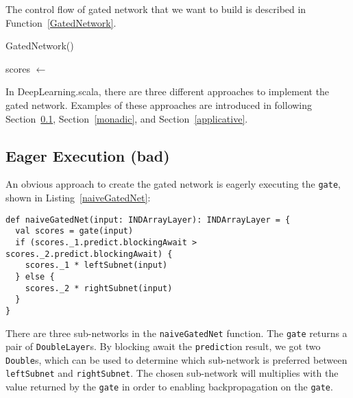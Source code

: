 The control flow of gated network that we want to build is described in Function~\ref{GatedNetwork}.

\begin{function}[H]
  \caption{GatedNetwork()\label{GatedNetwork}}
  scores $\leftarrow$ \;
\end{function}

In DeepLearning.scala, there are three different approaches to implement the gated network. Examples of these approaches are introduced in following Section~\ref{eager}, Section~\ref{monadic}, and Section~\ref{applicative}.

\subsection{Eager Execution (bad)}
\label{eager}

An obvious approach to create the gated network is eagerly executing the \lstinline{gate}, shown in Listing~\ref{naiveGatedNet}:

\begin{lstlisting}[float={h t b p},caption={The eager execution implementation of gated network}, label={naiveGatedNet}]
def naiveGatedNet(input: INDArrayLayer): INDArrayLayer = {
  val scores = gate(input)
  if (scores._1.predict.blockingAwait > scores._2.predict.blockingAwait) {
    scores._1 * leftSubnet(input)
  } else {
    scores._2 * rightSubnet(input)
  }
}
\end{lstlisting}


There are three sub-networks in the \lstinline{naiveGatedNet} function. The \lstinline{gate} returns a pair of \lstinline{DoubleLayer}s. By blocking await the \lstinline{predict}ion result, we got two \lstinline{Double}s, which can be used to determine which sub-network is preferred between \lstinline{leftSubnet} and \lstinline{rightSubnet}. The chosen sub-network will multiplies with the value returned by the \lstinline{gate} in order to enabling backpropagation on the \lstinline{gate}.

